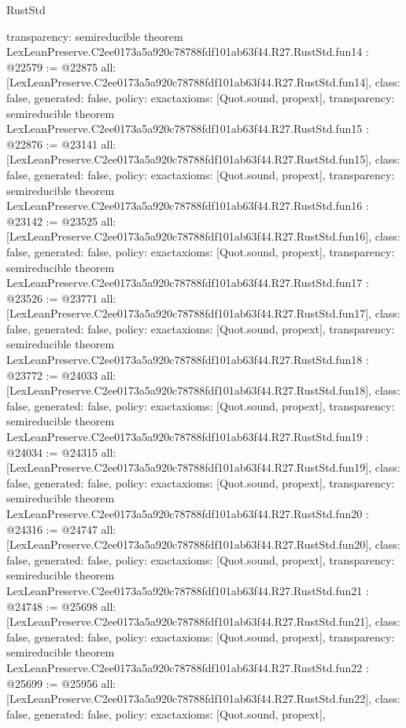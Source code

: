 \begin{lexlean}{RustStd}
\begin{coremodule}
{  transparency: semireducible
}
theorem LexLeanPreserve.C2ee0173a5a920c78788fdf101ab63f44.R27.RustStd.fun14 : @22579 := @22875 {
  all: [LexLeanPreserve.C2ee0173a5a920c78788fdf101ab63f44.R27.RustStd.fun14],
  class: false,
  generated: false,
  policy: exact{axioms: [Quot.sound, propext]},
  transparency: semireducible
}
theorem LexLeanPreserve.C2ee0173a5a920c78788fdf101ab63f44.R27.RustStd.fun15 : @22876 := @23141 {
  all: [LexLeanPreserve.C2ee0173a5a920c78788fdf101ab63f44.R27.RustStd.fun15],
  class: false,
  generated: false,
  policy: exact{axioms: [Quot.sound, propext]},
  transparency: semireducible
}
theorem LexLeanPreserve.C2ee0173a5a920c78788fdf101ab63f44.R27.RustStd.fun16 : @23142 := @23525 {
  all: [LexLeanPreserve.C2ee0173a5a920c78788fdf101ab63f44.R27.RustStd.fun16],
  class: false,
  generated: false,
  policy: exact{axioms: [Quot.sound, propext]},
  transparency: semireducible
}
theorem LexLeanPreserve.C2ee0173a5a920c78788fdf101ab63f44.R27.RustStd.fun17 : @23526 := @23771 {
  all: [LexLeanPreserve.C2ee0173a5a920c78788fdf101ab63f44.R27.RustStd.fun17],
  class: false,
  generated: false,
  policy: exact{axioms: [Quot.sound, propext]},
  transparency: semireducible
}
theorem LexLeanPreserve.C2ee0173a5a920c78788fdf101ab63f44.R27.RustStd.fun18 : @23772 := @24033 {
  all: [LexLeanPreserve.C2ee0173a5a920c78788fdf101ab63f44.R27.RustStd.fun18],
  class: false,
  generated: false,
  policy: exact{axioms: [Quot.sound, propext]},
  transparency: semireducible
}
theorem LexLeanPreserve.C2ee0173a5a920c78788fdf101ab63f44.R27.RustStd.fun19 : @24034 := @24315 {
  all: [LexLeanPreserve.C2ee0173a5a920c78788fdf101ab63f44.R27.RustStd.fun19],
  class: false,
  generated: false,
  policy: exact{axioms: [Quot.sound, propext]},
  transparency: semireducible
}
theorem LexLeanPreserve.C2ee0173a5a920c78788fdf101ab63f44.R27.RustStd.fun20 : @24316 := @24747 {
  all: [LexLeanPreserve.C2ee0173a5a920c78788fdf101ab63f44.R27.RustStd.fun20],
  class: false,
  generated: false,
  policy: exact{axioms: [Quot.sound, propext]},
  transparency: semireducible
}
theorem LexLeanPreserve.C2ee0173a5a920c78788fdf101ab63f44.R27.RustStd.fun21 : @24748 := @25698 {
  all: [LexLeanPreserve.C2ee0173a5a920c78788fdf101ab63f44.R27.RustStd.fun21],
  class: false,
  generated: false,
  policy: exact{axioms: [Quot.sound, propext]},
  transparency: semireducible
}
theorem LexLeanPreserve.C2ee0173a5a920c78788fdf101ab63f44.R27.RustStd.fun22 : @25699 := @25956 {
  all: [LexLeanPreserve.C2ee0173a5a920c78788fdf101ab63f44.R27.RustStd.fun22],
  class: false,
  generated: false,
  policy: exact{axioms: [Quot.sound, propext]},
}
\end{coremodule}
\end{lexlean}
